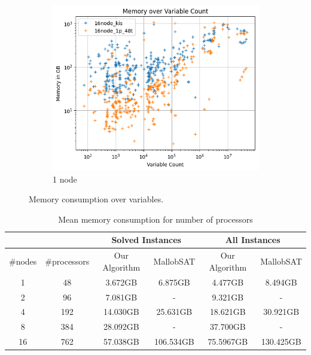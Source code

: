 \documentclass[12pt,a4paper,twoside]{scrartcl}
\numberwithin{equation}{section}
\begin{document}
\begin{figure}
\begin{subfigure}[c]{.4\textwidth}
    \center
    \includegraphics[scale=.3]{plots/16node_compare/mem_abs_over_vars.png}
    \caption{1 node}
  \end{subfigure}
  \caption{Memory consumption over variables.}
  \label{fig:memAbsVars}
\end{figure}

\begin{table}
  \center
  \begin{tabular}{ c|c|c|c|c|c }
    \multicolumn{2}{c|}{} & \multicolumn{2}{c|}{Solved Instances} & \multicolumn{2}{c}{All Instances}\\
    \hline
    \#nodes & \#processors & Our Algorithm & MallobSAT & Our Algorithm & MallobSAT \\
    \hline
    1  & 48  & 3.672GB & 6.875GB & 4.477GB & 8.494GB\\
    \hline
    2  & 96  & 7.081GB & - & 9.321GB & -\\
    \hline
    4  & 192 & 14.030GB & 25.631GB & 18.621GB & 30.921GB\\
    \hline
    8  & 384 & 28.092GB & - & 37.700GB & -\\
    \hline
    16 & 762 & 57.038GB & 106.534GB & 75.5967GB & 130.425GB
  \end{tabular}
  \caption{Mean memory consumption for number of processors}
  \label{tab:memMean}
\end{table}
\end{document}
